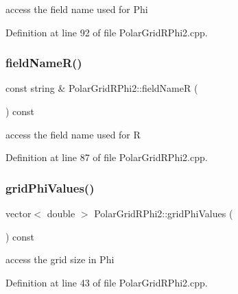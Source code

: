 access the field name used for Phi 



Definition at line 92 of file Polar\+Grid\+R\+Phi2.\+cpp.

\hypertarget{class_d_d4hep_1_1_geometry_1_1_polar_grid_r_phi2_ab19b5dc8f9b39f3fadbfc1cfec40fa28}{}\label{class_d_d4hep_1_1_geometry_1_1_polar_grid_r_phi2_ab19b5dc8f9b39f3fadbfc1cfec40fa28} 
\subsubsection{\texorpdfstring{field\+Name\+R()}{fieldNameR()}}
{\footnotesize\ttfamily const string \& Polar\+Grid\+R\+Phi2\+::field\+NameR (\begin{DoxyParamCaption}{ }\end{DoxyParamCaption}) const}



access the field name used for R 



Definition at line 87 of file Polar\+Grid\+R\+Phi2.\+cpp.

\hypertarget{class_d_d4hep_1_1_geometry_1_1_polar_grid_r_phi2_a8f33bfad7556d11d55163283d8a603df}{}\label{class_d_d4hep_1_1_geometry_1_1_polar_grid_r_phi2_a8f33bfad7556d11d55163283d8a603df} 
\subsubsection{\texorpdfstring{grid\+Phi\+Values()}{gridPhiValues()}}
{\footnotesize\ttfamily vector$<$ double $>$ Polar\+Grid\+R\+Phi2\+::grid\+Phi\+Values (\begin{DoxyParamCaption}{ }\end{DoxyParamCaption}) const}



access the grid size in Phi 



Definition at line 43 of file Polar\+Grid\+R\+Phi2.\+cpp.

